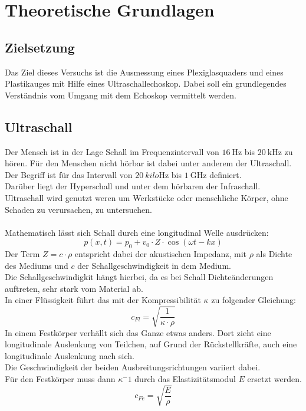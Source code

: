 \newpage
\section{Theoretische Grundlagen}


\subsection{Zielsetzung}
Das Ziel dieses Versuchs ist die Ausmessung eines Plexiglasquaders und eines Plastikauges mit Hilfe eines Ultraschallechoskop. 
Dabei soll ein grundlegendes Verständnis vom Umgang mit dem Echoskop vermittelt werden.

\subsection{Ultraschall}

\noindent
Der Mensch ist in der Lage Schall im Frequenzintervall von $\SI{16}{\hertz}$ bis $\SI{20}{\kilo\hertz}$ zu hören. 
Für den Menschen nicht hörbar ist dabei unter anderem der Ultraschall. 
Der Begriff ist für das Intervall von $\SI{20}{kilo\hertz}$ bis $\SI{1}{\giga\hertz}$ definiert.\\
Darüber liegt der Hyperschall und unter dem hörbaren der Infraschall.\\
Ultraschall wird genutzt weren um Werkstücke oder menschliche Körper, ohne Schaden zu verursachen, zu untersuchen.\\\\

\noindent
Mathematisch lässt sich Schall durch eine longitudinal Welle ausdrücken:
\begin{equation*}
    p(x,t)=p_0+v_0\cdot Z\cdot \cos{(\omega t-kx)}
\end{equation*}
Der Term $Z=c\cdot \rho$ entspricht dabei der akustischen Impedanz, mit $\rho$ als Dichte des Mediums und $c$ der Schallgeschwindigkeit in dem Medium.\\
Die Schallgeschwindigkit hängt hierbei, da es bei Schall Dichteänderungen auftreten, sehr stark vom Material ab.\\
In einer Flüssigkeit führt das mit der Kompressibilität $\kappa$ zu folgender Gleichung:
\begin{equation*}
    c_{Fl}=\sqrt{\frac{1}{\kappa\cdot\rho}}
\end{equation*}
In einem Festkörper verhällt sich das Ganze etwas anders. 
Dort zieht eine longitudinale Auslenkung von Teilchen, auf Grund der Rückstellkräfte, auch eine longitudinale Auslenkung nach sich.\\
Die Geschwindigkeit der beiden Ausbreitungsrichtungen variiert dabei.\\
Für den Festkörper muss dann $\kappa^-1$ durch das Elastizitätsmodul $E$ ersetzt werden.
\begin{equation*}
    c_{Fe}=\sqrt{\frac{E}{\rho}}
\end{equation*}


